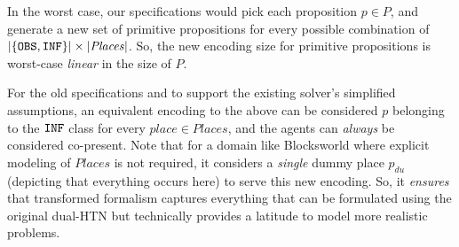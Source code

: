 \documentclass[letterpaper]{article} %
\newtheorem{theorem}{Theorem}[section]
\begin{document}
In the worst case, our specifications would pick each proposition $p \in P$, and generate a new set of primitive propositions for every possible combination of $|\{\texttt{OBS},\texttt{INF}\}| \times |\mathit{Places}|$. 
So, the new encoding size for primitive propositions is worst-case \textit{linear} in the size of $P$.

For the old specifications and to support the existing solver's simplified assumptions, an equivalent encoding to the above can be considered $p$ belonging to the $\texttt{INF}$ class for every $place \in \mathit{Places}$, and the agents can \textit{always} be considered co-present.  
Note that for a domain like Blocksworld where explicit modeling of $\mathit{Places}$ is not required, it considers a \textit{single} dummy place $p_{du}$ (depicting that everything occurs here) to serve this new encoding. So, it \textit{ensures} that transformed formalism captures everything that can be formulated using the original dual-HTN but technically provides a latitude to model more realistic problems. 


\end{document}
